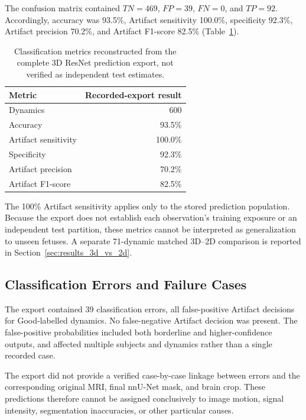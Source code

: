 The confusion matrix contained $TN=469$, $FP=39$, $FN=0$, and $TP=92$. Accordingly, accuracy was 93.5\%, Artifact sensitivity 100.0\%, specificity 92.3\%, Artifact precision 70.2\%, and Artifact F1-score 82.5\% (Table~\ref{tab:3d_resnet_full_export_metrics}).

\begin{table}[htbp]
\centering
\caption{Classification metrics reconstructed from the complete 3D ResNet prediction export, not verified as independent test estimates.}
\label{tab:3d_resnet_full_export_metrics}
\begin{tabular}{lr}
\hline
Metric & Recorded-export result \\
\hline
Dynamics & 600 \\
Accuracy & 93.5\% \\
Artifact sensitivity & 100.0\% \\
Specificity & 92.3\% \\
Artifact precision & 70.2\% \\
Artifact F1-score & 82.5\% \\
\hline
\end{tabular}
\end{table}

The 100\% Artifact sensitivity applies only to the stored prediction population. Because the export does not establish each observation's training exposure or an independent test partition, these metrics cannot be interpreted as generalization to unseen fetuses. A separate 71-dynamic matched 3D--2D comparison is reported in Section~\ref{sec:results_3d_vs_2d}.

\subsection{Classification Errors and Failure Cases}
\label{subsec:results_3d_classification_errors}

The export contained 39 classification errors, all false-positive Artifact decisions for Good-labelled dynamics. No false-negative Artifact decision was present. The false-positive probabilities included both borderline and higher-confidence outputs, and affected multiple subjects and dynamics rather than a single recorded case.

The export did not provide a verified case-by-case linkage between errors and the corresponding original MRI, final nnU-Net mask, and brain crop. These predictions therefore cannot be assigned conclusively to image motion, signal intensity, segmentation inaccuracies, or other particular causes.

